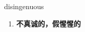 
\begin{frame}
{\huge disingenuous}
\begin{center}
\begin{enumerate}\Large
  \item \textbf{不真诚的，假惺惺的}
\end{enumerate}
\end{center}
\end{frame}

